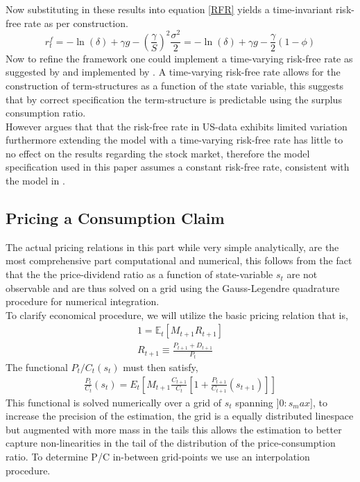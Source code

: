 Now substituting in these results into equation \eqref{RFR} yields a time-invariant risk-free rate as per construction.
\begin{equation}
r_{t}^{f}=-\ln (\delta)+\gamma g-\left(\frac{\gamma}{S}\right)^{2} \frac{\sigma^{2}}{2}=-\ln (\delta)+\gamma g-\frac{\gamma}{2}(1-\phi) \label{RFR1}
\end{equation}
Now to refine the framework one could implement a time-varying risk-free rate as suggested by \citet{Campbell1999} and implemented by \citet{Wachter2005}. A time-varying risk-free rate allows for the construction of term-structures as a function of the state variable, this suggests that by correct specification the term-structure is predictable using the surplus consumption ratio.\\
However \citet{Campbell1999} argues that that the risk-free rate in US-data exhibits limited variation furthermore extending the model with a time-varying risk-free rate has little to no effect on the results regarding the stock market, therefore the model specification used in this paper assumes a constant risk-free rate, consistent with the model in \citet{Campbell1999}.

\subsection{Pricing a Consumption Claim}
The actual pricing relations in this part while very simple analytically, are the most comprehensive part computational and numerical, this follows from the fact that the the price-dividend ratio as a function of state-variable $s_t$ are not observable and are thus solved on a grid using the Gauss-Legendre quadrature procedure for numerical integration. \\
\newline
To clarify economical procedure, we will utilize the basic pricing relation that is,
\begin{align}
    1 = \mathbb{E}_t \left [ M_{t+1}R_{t+1} \right] \nonumber \\
    R_{t+1} \equiv \frac{P_{t+1} + D_{t+1}}{P_t}
\end{align}
The functional $P_t/C_t(s_t)$ must then satisfy,
\begin{align}
    \frac{P_{t}}{C_{t}}\left(s_{t}\right)=E_{t}\left[M_{t+1} \frac{C_{t+1}}{C_{t}}\left[1+\frac{P_{t+1}}{C_{t+1}}\left(s_{t+1}\right)\right]\right] \label{PCRatio}
\end{align}
This functional is solved numerically over a grid of $s_t$ spanning $]0:s_max]$, to increase the precision of the estimation, the grid is a equally distributed linespace but augmented with more mass in the tails this allows the estimation to better capture non-linearities in the tail of the distribution of the price-consumption ratio. To determine P/C in-between grid-points we use an interpolation procedure.

